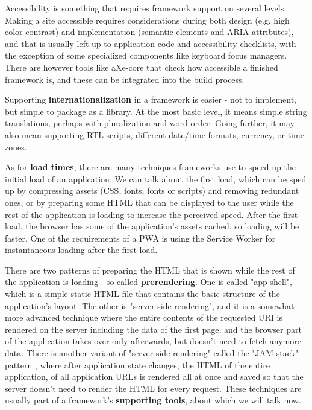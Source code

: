 \documentclass[english,odsaz]{fitthesis}
\begin{document}
Accessibility is something that requires framework support on several
levels. Making a site accessible requires considerations during both design
(e.g. high color contrast) and implementation (semantic elements and ARIA
attributes), and that is usually left up to application code and accessibility
checklists, with the exception of some specialized components like keyboard
focus managers. There are however tools like aXe-core that check how accessible
a finished framework is, and these can be integrated into the build process.

Supporting \textbf{internationalization} in a framework is easier - not to implement, but
simple to package as a library. At the most basic level, it means simple string
translations, perhaps with pluralization and word order. Going further, it may
also mean supporting RTL scripts, different date/time formats, currency, or time
zones.

As for \textbf{load times}, there are many techniques frameworks use to speed up the
initial load of an application. We can talk about the first load, which can be
sped up by compressing assets (CSS, fonts, fonts or scripts) and removing
redundant ones, or by preparing some HTML that can be displayed to the user
while the rest of the application is loading to increase the perceived
speed. After the first load, the browser has some of the application's assets
cached, so loading will be faster. One of the requirements of a PWA is using the
Service Worker for instantaneous loading after the first load.

There are two patterns of preparing the HTML that is shown while the rest of the
application is loading - so called \textbf{prerendering}. One is called "app shell",
which is a simple static HTML file that contains the basic structure of the
application's layout. The other is "server-side rendering", and it is a somewhat
more advanced technique where the entire contents of the requested URI is
rendered on the server including the data of the first page, and the browser
part of the application takes over only afterwards, but doesn't need to fetch
anymore data. There is another variant of "server-side rendering" called the
"JAM stack" pattern \cite{jamstack}, where after application state changes, the
HTML of the entire application, of all application URLs is rendered all at once
and saved so that the server doesn't need to render the HTML for every
request. These techniques are usually part of a framework's \textbf{supporting tools},
about which we will talk now.
\end{document}
